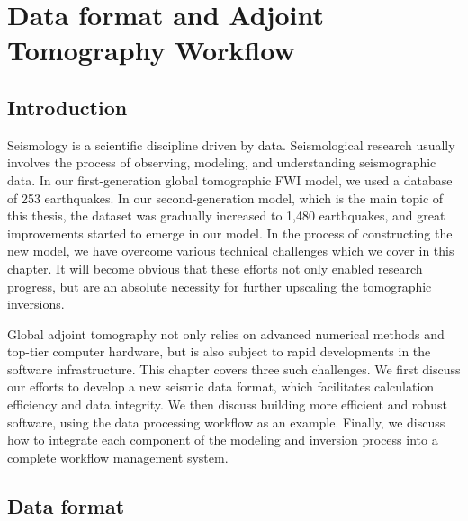 \chapter{Data format and Adjoint Tomography Workflow}
\label{ch:tools}

\section{Introduction}

Seismology is a scientific discipline driven by data.
Seismological research usually involves the process
of observing, modeling, and understanding seismographic data.
In our first-generation
global tomographic FWI model, we used a database of 253 earthquakes. In our second-generation
model, which is the main topic of this thesis, the dataset was gradually
increased to 1,480 earthquakes, and great improvements started to
emerge in our model.
In the process of constructing the new model, we have overcome various technical
challenges which we cover in this chapter.
It will become obvious that these efforts not only enabled research progress,
but are an absolute necessity for further upscaling the tomographic inversions.

Global adjoint tomography not only relies on advanced
numerical methods and top-tier computer hardware, but is also subject to 
rapid developments in the software infrastructure.
This chapter covers three such challenges.
We first discuss our efforts to develop a new seismic data format,
which facilitates calculation efficiency
and data integrity.
We then discuss building more efficient
and robust software, using the data processing workflow as an
example.
Finally, we discuss how to integrate each component of the modeling and inversion process
into a complete workflow management system.


\section{Data format}

